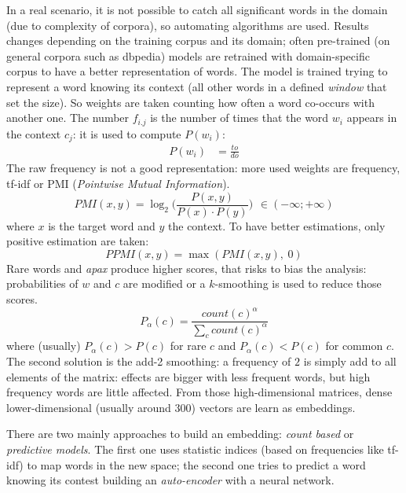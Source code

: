 \documentclass[11pt, a4page]{article}
\begin{document}
In a real scenario, it is not possible to catch all significant words in the domain (due to complexity of corpora), so automating algorithms are used.
Results changes depending on the training corpus and its domain; often pre-trained (on general corpora such as dbpedia) models are retrained with domain-specific corpus to have a better representation of words.
The model is trained trying to represent a word knowing its context (all other words in a defined \textit{window} that set the size).
So weights are taken counting how often a word co-occurs with another one.
The number $f_{i.j}$ is the number of times that the word $w_i$ appears in the context $c_j$: it is used to compute $P(w_i)$:
\begin{align*}  %
  P(w_i) &= \frac{to}{do}
\end{align*}
The raw frequency is not a good representation: more used weights are frequency, tf-idf or PMI (\textit{Pointwise Mutual Information}).
\begin{equation*}
  PMI(x, y) = \log_2 \Big( \frac{P(x, y)}{P(x) \cdot P(y)} \Big) \hspace{5pt} \in (-\infty; +\infty)
\end{equation*}
where $x$ is the target word and $y$ the context.
To have better estimations, only positive estimation are taken:
\begin{equation*}
  PPMI(x, y) = \max(PMI(x, y), \hspace{3pt} 0)
\end{equation*}
Rare words and \textit{apax} produce higher scores, that risks to bias the analysis: probabilities of $w$ and $c$ are modified or a $k$-smoothing is used to reduce those scores.
\begin{equation*}
  P_\alpha(c) = \frac{count(c)^\alpha}{\sum_c count(c)^\alpha}
\end{equation*}
where (usually) $P_\alpha(c) > P(c)$ for rare $c$ and $P_\alpha(c) < P(c)$ for common $c$.
The second solution is the add-2 smoothing: a frequency of $2$ is simply add to all elements of the matrix: effects are bigger with less frequent words, but high frequency words are little affected.
From those high-dimensional matrices, dense lower-dimensional (usually around 300) vectors are learn as embeddings.

There are two mainly approaches to build an embedding: \textit{count based} or \textit{predictive models}.
The first one uses statistic indices (based on frequencies like tf-idf) to map words in the new space; the second one tries to predict a word knowing its contest building an \textit{auto-encoder} with a neural network.
\end{document}
